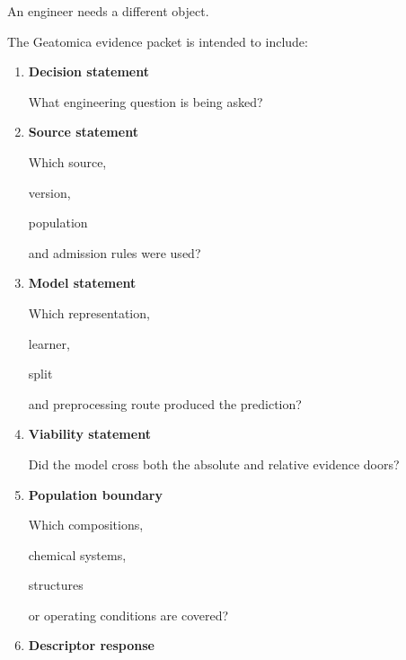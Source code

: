 \documentclass[11pt,a4paper,oneside]{report}
\providecommand{\term}[1]{\textbf{#1}}
\begin{document}
An engineer needs a different object.



The Geatomica evidence packet is intended to include:



\begin{enumerate}



\item

\term{Decision statement}



What engineering question is being asked?



\item

\term{Source statement}



Which source,

version,

population

and admission rules were used?



\item

\term{Model statement}



Which representation,

learner,

split

and preprocessing route produced the prediction?



\item

\term{Viability statement}



Did the model cross both the absolute and relative evidence doors?



\item

\term{Population boundary}



Which compositions,

chemical systems,

structures

or operating conditions are covered?



\item

\term{Descriptor response}




\end{enumerate}
\end{document}
